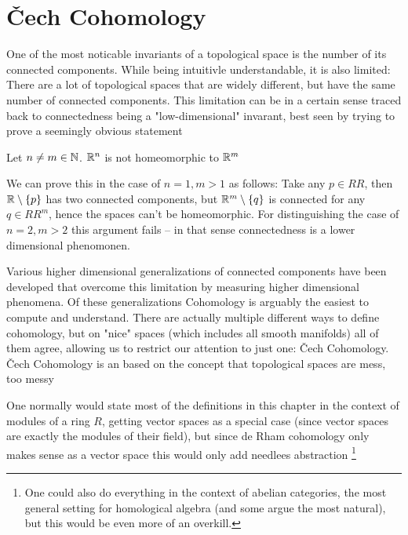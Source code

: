 \chapter{Čech Cohomology}
One of the most noticable invariants of a topological space is the number of its connected components.
While being intuitivle understandable, it is also limited: There are a lot of topological spaces that are
widely different, but have the same number of connected components. This limitation can be in a certain sense
traced back to connectedness being a "low-dimensional" invarant, best seen by trying to prove a seemingly obvious statement
\begin{theorem}
	Let $n \neq m \in \mathbb{N}$. $\mathbb{R}^n$ is not homeomorphic to $\mathbb{R}^m$
\end{theorem}
We can prove this in the case of $n = 1, m > 1$ as follows: Take any $p \in RR$, then $\mathbb{R} \setminus \{p\}$ has
two connected components, but $\mathbb{R}^m \setminus \{q\}$ is connected for any $q \in RR^m$, hence the spaces can't
be homeomorphic. For distinguishing the case of $n = 2, m > 2$ this argument fails – in that sense connectedness
is a lower dimensional phenomonen.

Various higher dimensional generalizations of connected components have been developed
that overcome this limitation by measuring higher dimensional phenomena. Of these generalizations
Cohomology is arguably the easiest to compute and understand. There are actually multiple different
ways to define cohomology, but on "nice" spaces (which includes all smooth manifolds) all of them agree, allowing
us to restrict our attention to just one: Čech Cohomology. Čech Cohomology is an based on the concept that topological
spaces are mess, too messy
\begin{remark}
One normally would state most of the definitions in this chapter in
the context of modules of a ring $R$, getting vector spaces as a special
case (since vector spaces are exactly the modules of their field),
but since de Rham cohomology only makes sense as a vector space this
would only add needlees abstraction \footnote{
	One could also do everything in the context of abelian categories,
	the most general setting for homological algebra
	(and some argue the most natural), but this would be even more of an
	overkill.
}
\end{remark}

